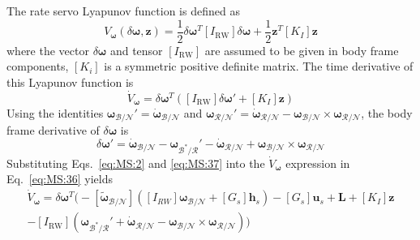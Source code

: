 \documentclass[]{BasiliskReportMemo}
\begin{document}
The rate servo Lyapunov function is defined as 
\begin{equation}
	\label{eq:MS:35}
	V_{\bm\omega}(\delta\bm\omega, \bm z) = \frac{1}{2} \delta\bm\omega ^{T} [I_{\text{RW}}] \delta\bm\omega + \frac{1}{2} \bm z ^{T} [K_{I}] \bm z
\end{equation}
where the vector $\delta\bm\omega$ and tensor $[I_{\text{RW}}]$ are assumed to be given in body frame components, $[K_{i}]$ is a symmetric positive definite matrix.  The time derivative of this Lyapunov function is
\begin{equation}
	\label{eq:MS:36}
	\dot V_{\bm\omega} = \delta\bm\omega^{T} \left(
		[I_{\text{RW}}] \delta\bm\omega' + [K_{I}] \bm z
	\right)
\end{equation}
Using the identities ${\bm\omega}_{\mathcal{B}/\mathcal{N}}' = \dot{\bm\omega}_{\mathcal{B}/\mathcal{N}}$ and $ \bm\omega_{\mathcal{R}/\mathcal{N}}' =  \dot{\bm\omega}_{\mathcal{R}/\mathcal{N}} -  {\bm\omega}_{\mathcal{B}/\mathcal{N}} \times  \bm\omega_{\mathcal{R}/\mathcal{N}}$,\cite{schaub} the body frame derivative of $\delta \bm\omega$ is
\begin{equation}
	\label{eq:MS:37}
	\delta\bm \omega '= \dot{\bm\omega}_{\mathcal{B}/\mathcal{N}} - \bm\omega_{\mathcal{B}^{\ast}/\mathcal{R}} ' -  \dot{\bm\omega}_{\mathcal{R}/\mathcal{N}} +  {\bm\omega}_{\mathcal{B}/\mathcal{N}} \times  \bm\omega_{\mathcal{R}/\mathcal{N}}
\end{equation}
Substituting Eqs.~\eqref{eq:MS:2} and \eqref{eq:MS:37} into the $\dot V_{\bm\omega}$ expression in Eq.~\eqref{eq:MS:36} yields
\begin{multline}
	\label{eq:MS:38}
	\dot V_{\bm\omega} = \delta\bm\omega^{T} \Big(
		- [\tilde{\bm \omega}_{\mathcal{B}/\mathcal{N}}] \left( 
	[I_{RW}] \bm\omega_{\mathcal{B}/\mathcal{N}} + [G_{s}] \bm h_{s} 
	\right) - [G_{s}] \bm u_{s} + \bm L + [K_{I}] \bm z
	\\
	- [I_{\text{RW}}](\bm\omega_{\mathcal{B}^{\ast}/\mathcal{R}} ' +  \dot{\bm\omega}_{\mathcal{R}/\mathcal{N}} - {\bm\omega}_{\mathcal{B}/\mathcal{N}} \times  \bm\omega_{\mathcal{R}/\mathcal{N}})
	\Big)
\end{multline}
\end{document}
